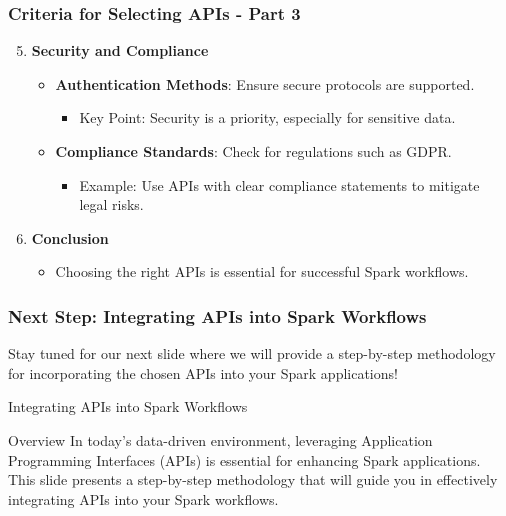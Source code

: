 \documentclass[aspectratio=169]{beamer}
\begin{document}
\begin{frame}[fragile]
    \frametitle{Criteria for Selecting APIs - Part 3}
    \begin{enumerate}
        \setcounter{enumi}{4} %
        \item \textbf{Security and Compliance}
        \begin{itemize}
            \item \textbf{Authentication Methods}: Ensure secure protocols are supported.
            \begin{itemize}
                \item Key Point: Security is a priority, especially for sensitive data.
            \end{itemize}
            \item \textbf{Compliance Standards}: Check for regulations such as GDPR.
            \begin{itemize}
                \item Example: Use APIs with clear compliance statements to mitigate legal risks.
            \end{itemize}
        \end{itemize}
        
        \item \textbf{Conclusion}
        \begin{itemize}
            \item Choosing the right APIs is essential for successful Spark workflows.
        \end{itemize}
    \end{enumerate}
\end{frame}

\begin{frame}[fragile]
    \frametitle{Next Step: Integrating APIs into Spark Workflows}
    Stay tuned for our next slide where we will provide a step-by-step methodology for incorporating the chosen APIs into your Spark applications!
\end{frame}

\begin{frame}{Integrating APIs into Spark Workflows}
    \begin{block}{Overview}
        In today’s data-driven environment, leveraging Application Programming Interfaces (APIs) is essential for enhancing Spark applications. This slide presents a step-by-step methodology that will guide you in effectively integrating APIs into your Spark workflows.
    \end{block}
\end{frame}
\end{document}
